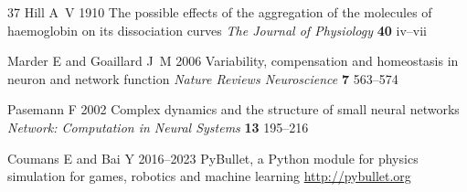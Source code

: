 \documentclass{iopjournal}
\begin{document}
\begin{thebibliography}{37}
Hill A~V 1910 The possible effects of the aggregation of the molecules of haemoglobin on its dissociation curves {\em The Journal of Physiology\/} {\bf 40} iv--vii

Marder E and Goaillard J~M 2006 Variability, compensation and homeostasis in neuron and network function {\em Nature Reviews Neuroscience\/} {\bf 7} 563--574

Pasemann F 2002 Complex dynamics and the structure of small neural networks {\em Network: Computation in Neural Systems\/} {\bf 13} 195--216

Coumans E and Bai Y 2016--2023 PyBullet, a Python module for physics simulation for games, robotics and machine learning \url{http://pybullet.org}

\end{thebibliography}
\end{document}
